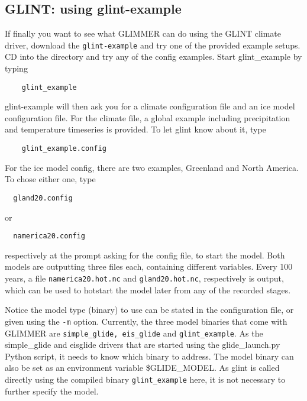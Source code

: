 
\subsection{GLINT: using glint-example}
If finally you want to see what GLIMMER can do using the GLINT climate driver,
download the \texttt{glint-example} and try one of the provided example setups.
CD into the directory and try any of the config examples. Start glint_example
by typing
\begin{verbatim}
    glint_example
\end{verbatim}
glint-example will then ask you for a climate configuration file and an ice model 
configuration file.
For the climate file, a global example including precipitation and temperature timeseries
is provided. To let glint know about it, type
\begin{verbatim}
    glint_example.config
\end{verbatim}
For the ice model config, there are two examples, Greenland and North America. To chose either one, type
\begin{verbatim}
  gland20.config
\end{verbatim}
or
\begin{verbatim}
  namerica20.config
\end{verbatim}
respectively at the prompt asking for the config file, to start the model.
Both models are outputting three files each, containing different variables.
Every 100 years, a file \texttt{namerica20.hot.nc} and \texttt{gland20.hot.nc}, respectively is output, 
which can be used to hotstart the model later from any of the recorded stages.

Notice the model type (binary) to use can be stated in the configuration file,
or given using the \texttt{-m} option. Currently, the three model binaries that
come with GLIMMER are \texttt{simple\_glide, eis\_glide} and
\texttt{glint\_example}. As the simple\_glide and eis\-glide drivers that are started using the glide\_launch.py Python script,
 it needs to know which binary to address. The model binary can also be set as an environment variable \$GLIDE\_MODEL. 
As glint is called directly using the compiled binary \texttt{glint\_example} here, it is not necessary to further 
specify the model.
